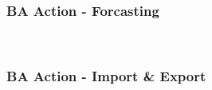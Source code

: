\documentclass[14pt, unknownkeysallowed]{beamer}
\begin{document}
\begin{frame}
\frametitle{BA Action - Forcasting} \ \vspace{.5em}
\end{frame}
\begin{frame}
\frametitle{BA Action - Import \& Export} \ \vspace{.5em}
\end{frame}
\end{document}
